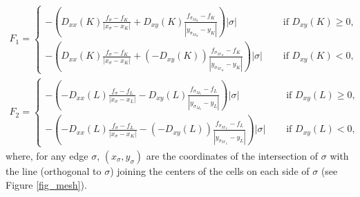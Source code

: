 \documentclass[final,11pt]{elsarticle}
\begin{document}
\begin{equation}
    \begin{gathered}
    F_1=\left\{\begin{array}{ll}
    \displaystyle-\left(D_{xx}(K)\frac{f_{\sigma}-f_{K}}{|x_\sigma-x_K|}+D_{xy}(K)\frac{f_{\sigma_{M_K}}-f_{K}}{|y_{\sigma_{M_K}}-y_K|}\right)|\sigma|&\quad\mbox{ if }D_{xy}(K)\geq 0,\\[1.2em]
    \displaystyle-\left(D_{xx}(K)\frac{f_{\sigma}-f_{K}}{|x_\sigma-x_K|}+(-D_{xy}(K))\frac{f_{\sigma_{M'_K}}-f_{K}}{|y_{\sigma_{M'_K}}-y_{K}|}\right)|\sigma|&\quad\mbox{ if } D_{xy}(K)< 0,
    \end{array}\right.\\
    F_2=\left\{\begin{array}{ll}
    \displaystyle-\left(-D_{xx}(L)\frac{f_{\sigma}-f_{L}}{|x_\sigma-x_L|}-D_{xy}(L)\frac{f_{\sigma_{M_L}}-f_{L}}{|y_{\sigma_{M_L}}-y_L|}\right)|\sigma|&\quad\mbox{ if }D_{xy}(L)\geq 0,\\[1.2em]
    \displaystyle-\left(-D_{xx}(L)\frac{f_{\sigma}-f_{L}}{|x_\sigma-x_K|}-(-D_{xy}(L))\frac{f_{\sigma_{M'_L}}-f_{L}}{|y_{\sigma_{M'_L}}-y_{L}|}\right)|\sigma|&\quad\mbox{ if } D_{xy}(L)< 0,
    \end{array}\right.
    \end{gathered}
    \label{eq_F1_F2_edge}
\end{equation}
where, for any edge $\sigma$, $(x_\sigma,y_\sigma)$ are the coordinates of the intersection of $\sigma$ with the line (orthogonal to $\sigma$) joining the centers of the cells on each side of $\sigma$ (see Figure \ref{fig_mesh}).
\end{document}
